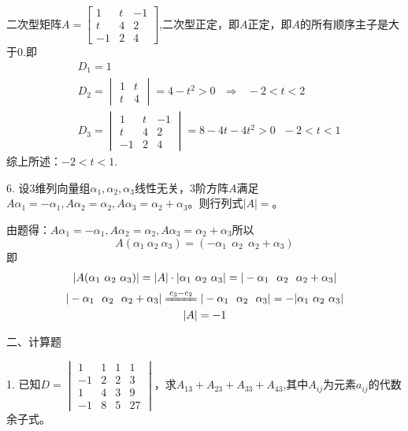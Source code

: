 \documentclass{article}
\begin{document}
\begin{jie}
二次型矩阵$A=
\begin{bmatrix}
  1 & t & -1 \\
 t & 4 & 2\\
 -1 &2 &4
\end{bmatrix}
$,二次型正定，即$A$正定，即$A$的所有顺序主子是大于0.即
\begin{align*}
&D_1=1\\
&D_2=
\begin{vmatrix}
  1 & t\\
  t & 4
\end{vmatrix}=4-t^2>0~~~\Rightarrow ~~~-2<t<2\\
&D_3=\begin{vmatrix}
  1 & t & -1 \\
 t & 4 & 2\\
 -1 &2 &4
     \end{vmatrix}=8-4t-4t^2>0~~~-2<t<1
\end{align*}
综上所述：$-2<t<1$.
\end{jie}

6. 设3维列向量组$\alpha_{1},\alpha_{2},\alpha_{3}$线性无关，3阶方阵$A$满足$A\alpha_{1}=-\alpha_{1},A\alpha_{2}=\alpha_{2},A\alpha_{3}=\alpha_{2}+\alpha_{3}$。则行列式$|A|=$\underline{\hphantom{~~~~~~~~~~}}。

\begin{jie}
由题得：$A\alpha_ {1}=-\alpha_{1},A\alpha_{2}=\alpha_{2},A\alpha_{3}=\alpha_{2}+\alpha_{3}$所以
\begin{equation*}
A(\alpha_{1}~\alpha_{2}~\alpha_{3})=(-\alpha_{1}~~\alpha_{2}~~\alpha_{2}+\alpha_{3})
\end{equation*}
即
\begin{gather*}
|A(\alpha_{1}~\alpha_{2}~\alpha_{3})|=|A|\cdot|\alpha_{1}~\alpha_{2}~\alpha_{3}|=|-\alpha_{1}~~\alpha_{2}~~\alpha_{2}+\alpha_{3}|\\
|-\alpha_{1}~~\alpha_{2}~~\alpha_{2}+\alpha_{3}|\xlongequal{c_{3}-c_{2}}|-\alpha_{1}~~\alpha_{2}~~\alpha_{3}|=-|\alpha_{1}~\alpha_{2}~\alpha_{3}|\\
|A|=-1
\end{gather*}
\end{jie}

二、计算题

1.
已知$D=
\begin{vmatrix}
  1 & 1 & 1 & 1 \\
  -1 & 2 & 2 & 3 \\
  1 & 4 & 3 & 9 \\
  -1 & 8 & 5 & 27
\end{vmatrix}
$，求$A_{13}+A_{23}+A_{33}+A_{43}$,其中$A_{ij}$为元素$a_{ij}$的代数余子式。
\end{document}
